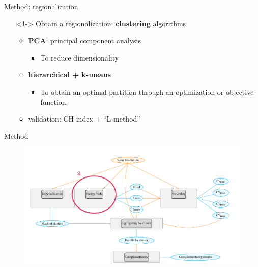 \documentclass{beamer}%
\begin{document}
\begin{frame}[fragile]{Method: regionalization}
  \begin{itemize}
  \item[] <1-> Obtain a regionalization: \textbf{\alert{clustering}} algorithms
  \begin{itemize}
  \item \textbf{PCA}: principal component analysis
    \begin{itemize}
    \item {\tiny{To reduce dimensionality}}
    \end{itemize}  
  \item \textbf{hierarchical + k-means}
    \begin{itemize}
    \item {\tiny{To obtain an optimal partition} through an optimization or objective function.}
    \end{itemize}  
  \item validation: CH index + ``L-method''
  \end{itemize}   
  \end{itemize}
\end{frame}

\begin{frame}[fragile]{Method}
\begin{figure}  
\includegraphics[scale=0.45]{multi_step2.pdf}
\end{figure}
\end{frame}
\end{document}
